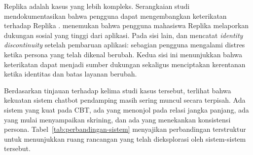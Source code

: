 Replika adalah kasus yang lebih kompleks. Serangkaian studi mendokumentasikan bahwa pengguna dapat mengembangkan keterikatan terhadap Replika \parencite{skjuve2021, skjuve2022}. \textcite{maples2024} menemukan bahwa pengguna mahasiswa Replika melaporkan dukungan sosial yang tinggi dari aplikasi. Pada sisi lain, \textcite{boine2023} dan \textcite{defreitasReplika2024} mencatat \textit{identity discontinuity} setelah pembaruan aplikasi: sebagian pengguna mengalami distres ketika persona yang telah dikenal berubah. Kedua sisi ini menunjukkan bahwa keterikatan dapat menjadi sumber dukungan sekaligus menciptakan kerentanan ketika identitas dan batas layanan berubah.

Berdasarkan tinjauan terhadap kelima studi kasus tersebut, terlihat bahwa kekuatan sistem chatbot pendamping masih sering muncul secara terpisah. Ada sistem yang kuat pada CBT, ada yang menonjol pada relasi jangka panjang, ada yang mulai menyampaikan skrining, dan ada yang menekankan konsistensi persona. Tabel~\ref{tab:perbandingan-sistem} menyajikan perbandingan terstruktur untuk menunjukkan ruang rancangan yang telah dieksplorasi oleh sistem-sistem tersebut.

